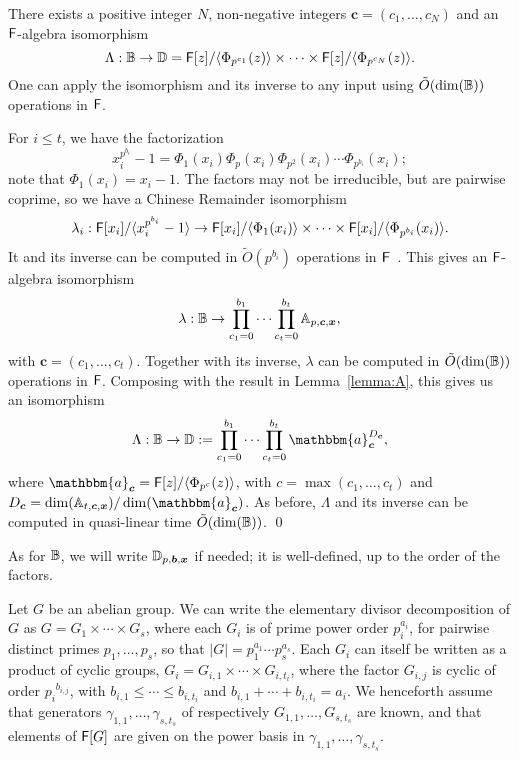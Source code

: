 \begin{lemma}\label{lemma:alg}
  There exists a positive integer $N$, non-negative integers
  $\boldsymbol{c}=(c_1,\dots,c_N)$ and  an
  ${\mathsf{F}}$-algebra isomorphism 
  $$\Lambda: \mathbb{B} \to \mathbb{D}= {\mathsf{F}}[z]/\langle \Phi_{p^{c_1}}(z) \rangle \times \cdots \times {\mathsf{F}}[z]/\langle \Phi_{p^{c_N}}(z)\rangle.$$
  One can apply the isomorphism and its inverse to any 
  input using $\tilde{O}(\dim(\mathbb{B}))$ operations in ${\mathsf{F}}$.
\end{lemma}
For $i \le t$, we have the factorization
$$x_i^{p^{b_i}}-1 = \Phi_1(x_i) \Phi_p(x_i) \Phi_{p^2}(x_i) \cdots
\Phi_{p^{b_i}}(x_i);$$ note that $\Phi_1(x_i)=x_i-1$.  The factors may
not be irreducible, but are pairwise coprime, so we have a
Chinese Remainder isomorphism
\[
  \lambda_i: {\mathsf{F}}[x_i]/\langle x_i^{p^{b_i}}-1 \rangle \to {\mathsf{F}}[x_i]/\langle \Phi_1(x_i)\rangle
  \times \cdots \times  {\mathsf{F}}[x_i]/\langle \Phi_{p^{b_i}}(x_i)\rangle.
\]
It and its inverse can be computed  
in $\tilde{O}(p^{b_i})$ operations in ${\mathsf{F}}$~\cite[Chapter~10]{vzGathen13}. 
This gives an ${\mathsf{F}}$-algebra isomorphism
$$\lambda: \mathbb{B} \to \prod_{c_1=0}^{b_1} \cdots \prod_{c_t=0}^{b_t} \mathbb{A}_{p,\boldsymbol{c},\boldsymbol{x}},$$
with $\boldsymbol{c}=(c_1,\dots,c_t)$. Together with its inverse, 
$\lambda$ can be computed in $\tilde{O}(\dim(\mathbb{B}))$ operations in ${\mathsf{F}}$.
Composing with the result in Lemma~\ref{lemma:A}, this gives
us an isomorphism
$$\Lambda: \B \to \D:=\prod_{c_1=0}^{b_1} \cdots \prod_{c_t=0}^{b_t}
\mathbbm{a}_{\boldsymbol{c}}^{D_{\boldsymbol{c}}},$$ where
$\mathbbm{a}_{\boldsymbol{c}} = \F[z]/\langle \Phi_{p^c}(z)\rangle$,
with $c =\max(c_1,\dots,c_t)$ and $D_{\boldsymbol{c}} =
\dim(\A_{t,\boldsymbol{c},\boldsymbol{x}})/\dim(\mathbbm{a}_{\boldsymbol{c}})$. As
before, $\Lambda$ and its inverse can be computed in quasi-linear time
$\tilde{O}(\dim(\mathbb{B}))$. \qed

As for $\mathbb{B}$, we will write $\mathbb{D}_{p,\boldsymbol{b},\boldsymbol{x}}$ if needed; it is
well-defined, up to the order of the factors.

\smallskip

 Let $G$ be an abelian group.  We can
write the elementary divisor decomposition of $G$ as $G = G_1 \times
\cdots \times G_s$, where each $G_i$ is of prime power order
$p_i^{a_i}$, for pairwise distinct primes $p_1,\dots,p_s$, so that
$|G| = p_1^{a_1} \cdots p_s^{a_s}$. Each $G_i$ can itself be written
as a product of cyclic groups, $G_i = G_{i,1} \times \cdots \times
G_{i,t_i}$, where the factor $G_{i,j}$ is cyclic of order
${p_i}^{b_{i,j}}$, with $b_{i,1} \le \cdots \le b_{i,t_i}$ and $b_{i,1} + \cdots +
b_{i,t_i} = a_i$. We henceforth assume that generators
$\gamma_{1,1},\dots,\gamma_{s,t_s}$ of respectively
$G_{1,1},\dots,G_{s,t_s}$ are known, and that elements of ${\mathsf{F}}[G]$ are
given on the power basis in $\gamma_{1,1},\dots,\gamma_{s,t_s}$. 

